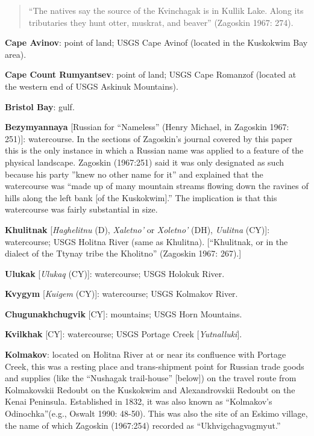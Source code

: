 \begin{hang}
\begin{quote}“The natives say the source of the Kvinchagak is in Kullik Lake. Along its tributaries they hunt otter, muskrat, and beaver” (Zagoskin 1967: 274).
 \end{quote}





\textbf{Cape Avinov}: point of land; USGS Cape Avinof (located in the Kuskokwim Bay area).



\textbf{Cape Count Rumyantsev}: point of land; USGS Cape Romanzof (located at the western end of USGS Askinuk Mountains).



\textbf{Bristol Bay}: gulf.



\textbf{Bezymyannaya} [Russian for “Nameless” (Henry Michael, in Zagoskin 1967: 251)]: watercourse. In the sections of Zagoskin’s journal covered by this paper this is the only instance in which a Russian name was applied to a feature of the physical landscape. Zagoskin (1967:251) said it was only designated as such because his party ”knew no other name for it” and explained that the watercourse was “made up of many mountain streams flowing down the ravines of hills along the left bank [of the Kuskokwim].” The implication is that this watercourse was fairly substantial in size.



\textbf{Khulitnak} [\textit{Haghelitnu} (D), \textit{Xaletno’} or \textit{Xoletno’} (DH), \textit{Uulitna} (CY)]: watercourse; USGS Holitna River (same as Khulitna). [“Khulitnak, or in the dialect of the Ttynay tribe the Kholitno” (Zagoskin 1967: 267).]



\textbf{Ulukak} [\textit{Ulukaq} (CY)]: watercourse; USGS Holokuk River.



\textbf{Kvygym} [\textit{Kuigem} (CY)]: watercourse; USGS Kolmakov River.



\textbf{Chugunakhchugvik} [CY]: mountains; USGS Horn Mountains.



\textbf{Kvilkhak} [CY]: watercourse; USGS Portage Creek [\textit{Yutnalluki}].



\textbf{Kolmakov}: located on Holitna River at or near its confluence with Portage Creek, this was a resting place and trans-shipment point for Russian trade goods and supplies (like the “Nushagak trail-house” [below]) on the travel route from Kolmakovskii Redoubt on the Kuskokwim and Alexandrovskii Redoubt on the Kenai Peninsula. Established in 1832, it was also known as “Kolmakov’s Odinochka”(e.g., Oswalt 1990: 48-50). This was also the site of an Eskimo village, the name of which Zagoskin (1967:254) recorded as “Ukhvigchagvagmyut.”




\end{hang}

